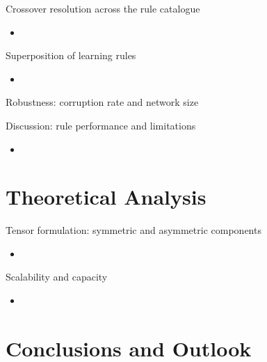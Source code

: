 \documentclass[aspectratio=169]{beamer}
\begin{document}
\begin{frame}{Crossover resolution across the rule catalogue}
  \begin{itemize}
    \item
  \end{itemize}
\end{frame}

\begin{frame}{Superposition of learning rules}
  \begin{itemize}
    \item
  \end{itemize}
\end{frame}

\begin{frame}{Robustness: corruption rate and network size}
  \centering
\end{frame}

\begin{frame}{Discussion: rule performance and limitations}
  \begin{itemize}
    \item
  \end{itemize}
\end{frame}


\section[Analysis]{Theoretical Analysis}

\begin{frame}{Tensor formulation: symmetric and asymmetric components}
  \begin{itemize}
    \item
  \end{itemize}
\end{frame}

\begin{frame}{Scalability and capacity}
  \begin{itemize}
    \item
  \end{itemize}
\end{frame}


\section[Conclusions]{Conclusions and Outlook}
\end{document}
